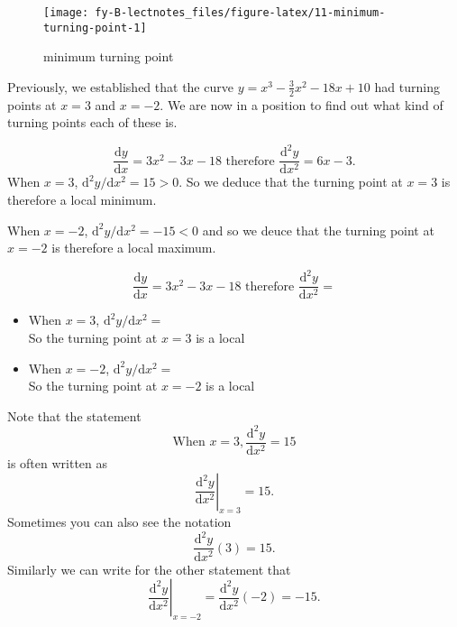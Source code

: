 \documentclass[
  11pt,
  oneside]{book}
\newcommand{\slide}{}
\theoremstyle{definition}
\theoremstyle{definition}
\theoremstyle{definition}
\theoremstyle{definition}
\theoremstyle{remark}
\begin{document}
\begin{figure}

{\centering \texttt{[image: fy-B-lectnotes\_files/figure-latex/11-minimum-turning-point-1]} 

}

\caption{minimum turning point}\label{fig:11-minimum-turning-point}
\end{figure}
\slide

Previously, we established that the curve \(y = x^3-\frac32 x^2-18x+10\) had turning points at \(x=3\) and \(x=-2\). We are now in a position to find out what kind of turning points each of these is.

\begin{notslides}

\[
\frac{\mathrm{d} y}{\mathrm{d} x} = 3x^2-3x-18\text{ therefore } \frac{\mathrm{d}^{2}y}{\mathrm{d} x^2} = 6x-3.
\]
When \(x = 3\), \(\mathrm{d}^{2}y/\mathrm{d} x^2=15 > 0\). So we deduce that the turning point at \(x=3\) is therefore a local minimum.

When \(x = -2\), \(\mathrm{d}^{2}y/\mathrm{d} x^2 = -15 < 0\) and so we deuce that the turning point at \(x = -2\) is therefore a local maximum.

\end{notslides}

\begin{slidesonly}

\[
\frac{\mathrm{d} y}{\mathrm{d} x} = 3x^2-3x-18\text{ therefore } \frac{\mathrm{d}^{2}y}{\mathrm{d} x^2} = 
\]

\begin{itemize}
\item
  When \(x = 3\), \(\mathrm{d}^{2}y/\mathrm{d} x^2=\)\\
  So the turning point at \(x=3\) is a local
\item
  When \(x = -2\), \(\mathrm{d}^{2}y/\mathrm{d} x^2=\)\\
  So the turning point at \(x=-2\) is a local
\end{itemize}

\end{slidesonly}

\slide

Note that the statement
\[
\text{When }x = 3, \frac{\mathrm{d}^{2}y}{\mathrm{d} x^2} = 15
\]
is often written as
\[
\left.\frac{\mathrm{d}^{2}y}{\mathrm{d} x^2}\right\vert_{x=3} = 15.
\]
Sometimes you can also see the notation
\[
\frac{\mathrm{d}^{2}y}{\mathrm{d} x^2}(3) = 15.
\]
Similarly we can write for the other statement that
\[
\left.\frac{\mathrm{d}^{2}y}{\mathrm{d} x^2}\right\vert_{x=-2} =
\frac{\mathrm{d}^{2}y}{\mathrm{d} x^2}(-2) = -15.
\]
\slide
\end{document}
